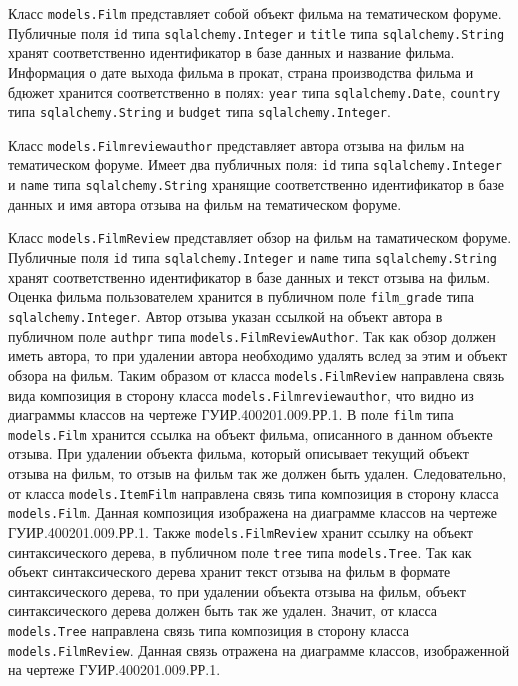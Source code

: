 Класс \texttt{models.Film} представляет собой объект фильма на тематическом форуме. Публичные поля \texttt{id} типа \texttt{sqlalchemy.Integer} и \texttt{title} типа \texttt{sqlalchemy.String} хранят соответственно идентификатор в базе данных и название фильма. Информация о дате выхода фильма в прокат, страна производства фильма и бдюжет хранится соответственно в полях: \texttt{year} типа \texttt{sqlal\-chemy.Date}, \texttt{country} типа \texttt{sqlalchemy.String} и \texttt{budget} типа \texttt{sqlalchemy.In\-teger}.

Класс \texttt{models.Filmreviewauthor} представляет автора отзыва на фильм на тематическом форуме. Имеет два публичных поля: \texttt{id} типа \texttt{sqlalchemy.Integer} и \texttt{name} типа \texttt{sqlalchemy.String} хранящие соответственно идентификатор в базе данных и имя автора отзыва на фильм на тематическом форуме.

Класс \texttt{models.FilmReview} представляет обзор на фильм на таматическом форуме. Публичные поля \texttt{id} типа \texttt{sqlalchemy.In\-teger} и \texttt{name} типа \texttt{sqlalchemy.String} хранят соответственно идентификатор в базе данных и текст отзыва на фильм. Оценка фильма пользователем хранится в публичном поле \texttt{film\_grade} типа \texttt{sqlalchemy.Integer}. Автор отзыва указан ссылкой на объект автора в публичном поле \texttt{authpr} типа \texttt{models.FilmReviewAuthor}. Так как обзор должен иметь автора, то при удалении автора необходимо удалять вслед за этим и объект обзора на фильм. Таким образом от класса \texttt{models.FilmReview} направлена связь вида композиция в сторону класса \texttt{models.Filmreviewauthor}, что видно из диаграммы классов на чертеже ГУИР.400201.009.РР.1. В поле \texttt{film} типа \texttt{models.Film} хранится ссылка на объект фильма, описанного в данном объекте отзыва. При удалении объекта фильма, который описывает текущий объект отзыва на фильм, то отзыв на фильм так же должен быть удален. Следовательно, от класса \texttt{models.ItemFilm} направлена связь типа композиция в сторону класса \texttt{models.Film}. Данная композиция изображена на диаграмме классов на чертеже ГУИР.400201.009.РР.1. Также \texttt{models.FilmReview} хранит ссылку на объект синтаксического дерева, в публичном поле \texttt{tree} типа \texttt{models.Tree}. Так как объект синтаксического дерева хранит текст отзыва на фильм в формате синтаксического дерева, то при удалении объекта отзыва на фильм, объект синтаксического дерева должен быть так же удален. Значит, от класса \texttt{models.Tree} направлена связь типа композиция в сторону класса \texttt{models.FilmReview}. Данная связь отражена на диаграмме классов, изображенной на чертеже ГУИР.400201.009.РР.1.

